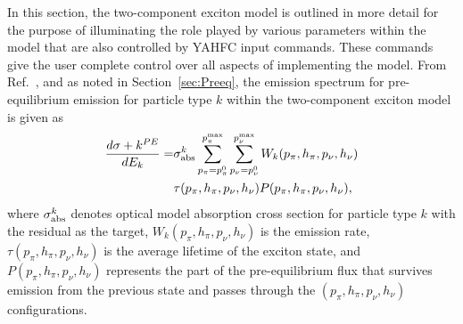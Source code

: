 \documentclass[
10pt,
showpacs,preprintnumbers,footinbib,
amsfonts,amsmath,amssymb,
aps,
prc,twocolumn,groupedaddress,superscriptaddress,
showkeys,
nofootinbib
]{revtex4-1}
\begin{document}
In this section, the two-component exciton model is outlined in more detail for the purpose of illuminating the role played by various parameters within the model that are also controlled by YAHFC input commands. These commands give the user complete control over all aspects of implementing the model. From Ref.~\cite{Koning:2004}, and as noted in Section~\ref{sec:Preeq}, the emission spectrum for pre-equilibrium emission for particle type $k$ within the two-component exciton model is given as
\begin{align}
\frac{d\sigma+k^{PE}}{dE_k}  =& \sigma_{\rm abs}^k 
     \sum_{p_\pi = p_\pi^0}^{p_\pi^{\rm max}}\sum_{p_\nu = p_\nu^0}^{p_\nu^{\rm max}}
     W_k(p_\pi,h_\pi,p_\nu,h_\nu) \notag \\
     & \tau(p_\pi,h_\pi,p_\nu,h_\nu) P(p_\pi,h_\pi,p_\nu,h_\nu),
\end{align}
where $\sigma^k_{\rm abs}$ denotes optical model absorption cross section for particle type $k$ with the residual as the target, $W_k(p_\pi,h_\pi,p_\nu,h_\nu)$ is the emission rate, $\tau(p_\pi,h_\pi,p_\nu,h_\nu)$ is the average lifetime of the exciton state, and $P(p_\pi,h_\pi,p_\nu,h_\nu)$ represents the part of the pre-equilibrium flux that survives emission from the previous state and passes through the $(p_\pi,h_\pi,p_\nu,h_\nu)$ configurations.
\end{document}
